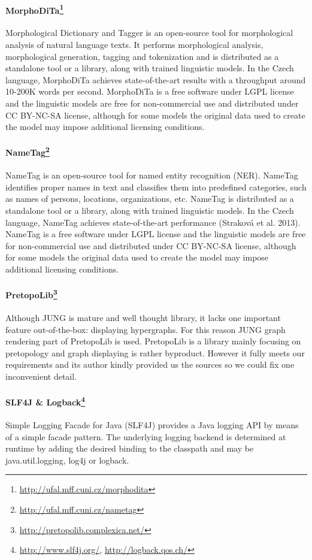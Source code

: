 \paragraph{MorphoDiTa\footnote{\url{http://ufal.mff.cuni.cz/morphodita}}}
Morphological Dictionary and Tagger is an open-source tool for morphological
analysis of natural language texts. It performs morphological analysis, 
morphological generation, tagging and tokenization and is distributed as
a standalone tool or a library, along with trained linguistic models. In
the Czech language, MorphoDiTa achieves state-of-the-art results with 
a throughput around 10-200K words per second. MorphoDiTa is a free software
under LGPL license and the linguistic models are free for non-commercial use
and distributed under CC BY-NC-SA license, although for some models the original
data used to create the model may impose additional licensing conditions.

\paragraph{NameTag\footnote{\url{http://ufal.mff.cuni.cz/nametag}}}
NameTag is an open-source tool for named entity recognition (NER). NameTag 
identifies proper names in text and classifies them into predefined categories,
such as names of persons, locations, organizations, etc. NameTag is distributed
as a standalone tool or a library, along with trained linguistic models.
In the Czech language, NameTag achieves state-of-the-art performance
(Straková et al. 2013). NameTag is a free software under LGPL license and the 
linguistic models are free for non-commercial use and distributed under CC 
BY-NC-SA license, although for some models the original data used to create
the model may impose additional licensing conditions.

\paragraph{PretopoLib\footnote{\url{http://pretopolib.complexica.net/}}}
Although JUNG is mature and well thought library, it lacks one important feature
out-of-the-box: displaying hypergraphs. For this reason JUNG graph rendering
part of PretopoLib is used. PretopoLib is a library mainly focusing on
pretopology and graph displaying is rather byproduct. However it fully meets our
requirements and its author kindly provided us the sources so we could fix one
inconvenient detail.

\paragraph{SLF4J \& Logback\footnote{\url{http://www.slf4j.org/}, \url{http://logback.qos.ch/}}}
Simple Logging Facade for Java (SLF4J) provides a Java logging API by means
of a simple facade pattern. The underlying logging backend is determined
at runtime by adding the desired binding to the classpath and may be
java.util.logging, log4j or logback.

